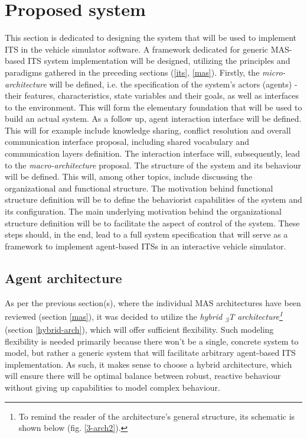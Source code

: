 \documentclass[main.tex]{subfiles}
\begin{document}
    
\section{Proposed system}\label{sec-system}

This section is dedicated to designing the system that will be used to implement ITS in the
vehicle simulator software. A framework dedicated for generic MAS-based ITS system
implementation will be designed, utilizing the principles and paradigms gathered in the
preceding sections (\ref{its}, \ref{mas}). Firstly, the \emph{micro-architecture} will be
defined, i.e. the specification of the system's actors (agents) - their features,
characteristics, state variables and their goals, as well as interfaces to the environment.
This will form the elementary foundation that will be used to build an actual system. As a
follow up, agent interaction interface will be defined. This will for example include
knowledge sharing, conflict resolution and overall communication interface proposal, including
shared vocabulary and communication layers definition. The interaction interface will,
subsequently, lead to the \emph{macro-architecture} proposal. The structure of the system and
its behaviour will be defined. This will, among other topics, include discussing the
organizational and functional structure. The motivation behind functional structure definition
will be to define the behaviorist capabilities of the system and its configuration. The main
underlying motivation behind the organizational structure definition will be to facilitate the
aspect of control of the system. These steps should, in the end, lead to a full system
specification that will serve as a framework to implement agent-based ITSs in an interactive
vehicle simulator.

\subsection{Agent architecture}

As per the previous section(s), where the individual MAS architectures have been reviewed
(section \ref{mas}), it was decided to utilize  the \emph{hybrid \textsubscript{3}T
architecture\footnote{To remind the reader of the architecture's general structure, its
schematic is shown below (fig. \ref{3-arch2}).}} (section \ref{hybrid-arch}), which will offer
sufficient flexibility.  Such modeling flexibility is needed primarily because there won't be a
single, concrete system to model, but rather a generic system that will facilitate arbitrary
agent-based ITS implementation. As such, it makes sense to choose a hybrid architecture, which
will ensure there will be optimal balance between robust, reactive behaviour without giving up
capabilities to model complex behaviour.
\end{document}
